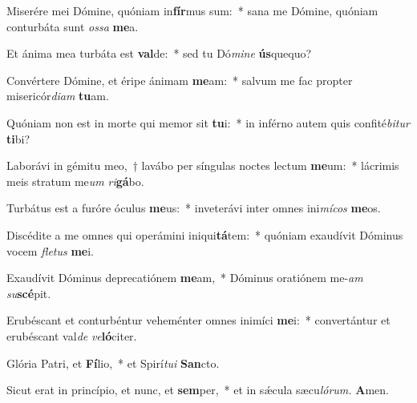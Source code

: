 \item Miserére mei Dómine, quóniam in\textbf{fír}mus sum:~* sana me Dómine, quóniam conturbáta sunt \textit{ossa} \textbf{me}a.
\item Et ánima mea turbáta est \textbf{val}de:~* sed tu Dó\textit{mine} \textbf{ús}quequo?
\item Convértere Dómine, et éripe ánimam \textbf{me}am:~* salvum me fac propter misericór\textit{diam} \textbf{tu}am.
\item Quóniam non est in morte qui memor sit \textbf{tu}i:~* in inférno autem quis confité\textit{bitur} \textbf{ti}bi?
\item Laborávi in gémitu meo,~† lavábo per síngulas noctes le\-ctum \textbf{me}um:~* lácrimis meis stratum me\tinyhspace\textit{um} \textit{ri}\textbf{gá}bo.
\item Turbátus est a furóre óculus \textbf{me}us:~* inveterávi inter omnes ini\textit{mícos} \textbf{me}os.
\item Discédite a me omnes qui operámini iniqui\textbf{tá}tem:~* quóniam exaudívit Dóminus vocem \textit{fletus} \textbf{me}i.
\item Exaudívit Dóminus deprecatiónem \textbf{me}am,~* Dóminus oratiónem me-\textit{am} \textit{su}\textbf{scé}pit.
\item Erubéscant et conturbéntur veheménter omnes inimíci \textbf{me}i:~* convertántur et erubéscant val\tinyhspace\textit{de} \textit{ve}\textbf{ló}citer.
\item Glória Patri, et \textbf{Fí}lio,~* et Spirí\tinyhspace\textit{tui} \textbf{San}cto.
\item Sicut erat in princípio, et nunc, et \textbf{sem}per,~* et in sǽcula sæcu\tinyhspace\textit{lórum.} \textbf{A}men.

